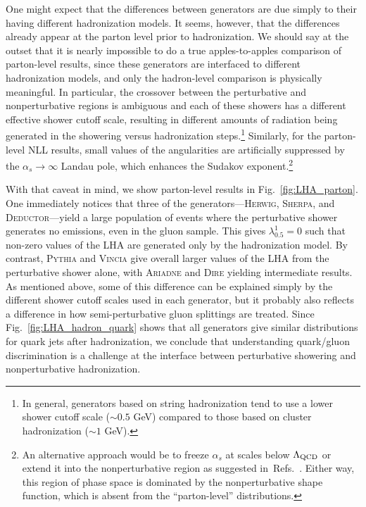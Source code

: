 \documentclass[11pt,letterpaper]{article}
\DeclareRobustCommand{\Fig}[1]{Fig.~\ref{#1}}
\DeclareRobustCommand{\Refs}[1]{Refs.~\cite{#1}}
\begin{document}
One might expect that the differences between generators are due
simply to their having different hadronization models.  It seems,
however, that the differences already appear at the parton level prior
to hadronization. We should say at the outset that it is nearly impossible to do a true apples-to-apples comparison of parton-level results, since these generators are interfaced to different hadronization models, and only the hadron-level comparison is physically meaningful.  In particular, the crossover between the perturbative and nonperturbative regions is ambiguous and each of these showers has a different effective shower cutoff scale, resulting in different amounts of radiation being generated in the showering versus hadronization steps.\footnote{In general, generators based on string hadronization tend to use a lower shower cutoff scale ($\sim 0.5$ GeV) compared to those based on cluster hadronization ($\sim 1$ GeV).}  Similarly, for the parton-level NLL results, small values of the angularities are artificially suppressed by the $\alpha_s \to \infty$ Landau pole, 
which enhances the Sudakov exponent.\footnote{An alternative approach would be to freeze $\alpha_s$ 
at scales below $\Lambda_{\rm QCD}$ or extend it into the nonperturbative
region as suggested in~\Refs{Dokshitzer:1995qm,Guffanti:2000ep,Gieseke:2007ad}.  Either way, this region of phase space is dominated by the nonperturbative shape function, which is absent from the ``parton-level'' distributions.}

With that caveat in mind, we show parton-level results in \Fig{fig:LHA_parton}.  One immediately notices that three of the
generators---\textsc{Herwig}, \textsc{Sherpa}, and
\textsc{Deductor}---yield a large population of events where the
perturbative shower generates no emissions, even in the gluon sample.  This gives
$\lambda_{0.5}^1 = 0$ such that non-zero values of the LHA are
generated only by the hadronization model.  By contrast,
\textsc{Pythia} and \textsc{Vincia} give overall larger values of the
LHA from the perturbative shower alone, with \textsc{Ariadne} and \textsc{Dire} yielding intermediate results.  As mentioned above, some of this difference can be explained simply by the different shower cutoff scales used in each generator, but it probably also reflects a difference in how semi-perturbative gluon splittings are treated.  Since \Fig{fig:LHA_hadron_quark} shows that all generators give similar distributions for quark jets after hadronization, we
conclude that understanding quark/gluon discrimination is a challenge
at the interface between perturbative showering and nonperturbative
hadronization.
\end{document}
